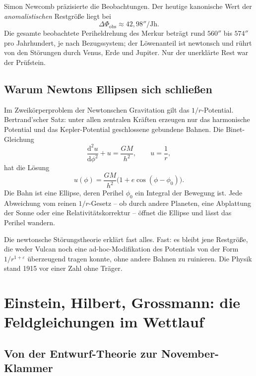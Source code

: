 \documentclass[11pt,a4paper]{article}
\theoremstyle{definition}
\theoremstyle{remark}
\begin{document}
Simon Newcomb präzisierte die Beobachtungen. Der heutige kanonische Wert der \emph{anomalistischen} Restgröße liegt bei
\begin{equation}
\Delta\Phi_{\mathrm{obs}}\approx 42{,}98''/\mathrm{Jh}.
\end{equation}
Die gesamte beobachtete Periheldrehung des Merkur beträgt rund \(560''\) bis \(574''\) pro Jahrhundert, je nach Bezugssystem; der Löwenanteil ist newtonsch und rührt von den Störungen durch Venus, Erde und Jupiter. Nur der unerklärte Rest war der Prüfstein.

\subsection{Warum Newtons Ellipsen sich schließen}

Im Zweikörperproblem der Newtonschen Gravitation gilt das \(1/r\)-Potential. Bertrand'scher Satz: unter allen zentralen Kräften erzeugen nur das harmonische Potential und das Kepler-Potential geschlossene gebundene Bahnen. Die Binet-Gleichung
\begin{equation}
\frac{\mathrm{d}^2 u}{\mathrm{d}\phi^2}+u=\frac{GM}{h^2},\qquad u=\frac{1}{r},
\end{equation}
hat die Lösung
\begin{equation}
u(\phi)=\frac{GM}{h^2}\bigl(1+e\cos(\phi-\phi_0)\bigr).
\end{equation}
Die Bahn ist eine Ellipse, deren Perihel \(\phi_0\) ein Integral der Bewegung ist. Jede Abweichung vom reinen \(1/r\)-Gesetz -- ob durch andere Planeten, eine Abplattung der Sonne oder eine Relativitätskorrektur -- öffnet die Ellipse und lässt das Perihel wandern.

Die newtonsche Störungstheorie erklärt fast alles. Fast: es bleibt jene Restgröße, die weder Vulcan noch eine ad-hoc-Modifikation des Potentials von der Form \(1/r^{1+\varepsilon}\) überzeugend tragen konnte, ohne andere Bahnen zu ruinieren. Die Physik stand 1915 vor einer Zahl ohne Träger.

\section{Einstein, Hilbert, Grossmann: die Feldgleichungen im Wettlauf}

\subsection{Von der Entwurf-Theorie zur November-Klammer}
\end{document}
